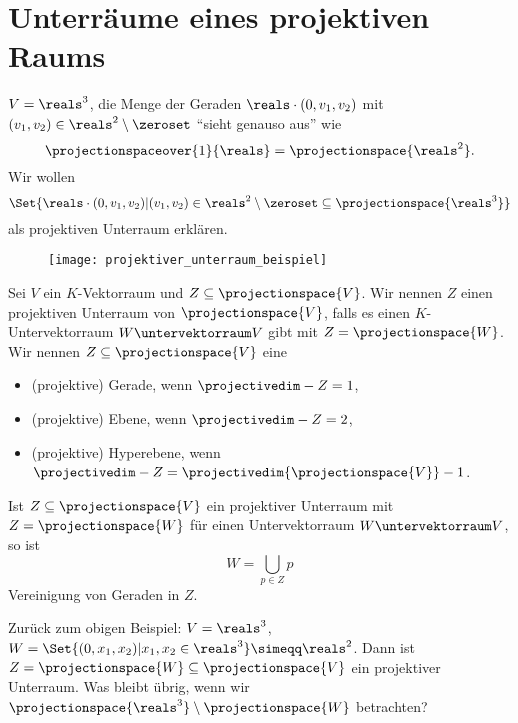 \section*{Unterräume eines projektiven Raums}
\begin{beispiel}
  \( V=\reals^3 \), die Menge der Geraden \( \reals\cdot(0,v_1,v_2) \) mit \( (v_1,v_2)\in \reals^2\setminus\zeroset \) \enquote{sieht genauso aus} wie
  \begin{equation*}
    \projectionspaceover{1}{\reals}=\projectionspace{\reals^2}.
  \end{equation*}
  Wir wollen
  \begin{equation*}
    \Set{\reals\cdot (0,v_1,v_2)|(v_1,v_2)\in \reals^2\setminus\zeroset\subseteq \projectionspace{\reals^3}}
  \end{equation*}
  als projektiven Unterraum erklären.
  \begin{figure}[H]
    \centering
    \texttt{[image: projektiver\_unterraum\_beispiel]}
    \label{fig:projektiver_unterraum_beispiel}
  \end{figure}
\end{beispiel}
\begin{definition*}
  Sei \( V \) ein \( K \)-Vektorraum und \( Z\subseteq \projectionspace{V} \). Wir nennen \( Z \) einen projektiven Unterraum von \( \projectionspace{V} \), falls es einen \( K \)-Untervektorraum \( W\untervektorraum V \) gibt mit \( Z=\projectionspace{W} \). Wir nennen \( Z\subseteq \projectionspace{V} \) eine
  \begin{itemize}
    \item (projektive) Gerade, wenn \( \projectivedim-{Z}=1 \),
    \item (projektive) Ebene, wenn  \( \projectivedim-{Z}=2 \),
    \item (projektive) Hyperebene, wenn \( \projectivedim-{Z}=\projectivedim{\projectionspace{V}}-1 \).
  \end{itemize}
\end{definition*}
\begin{bemerkung*}
  Ist \( Z\subseteq \projectionspace{V} \) ein projektiver Unterraum mit \( Z=\projectionspace{W} \) für einen Untervektorraum \( W\untervektorraum V\), so ist
  \begin{equation*}
    W=\bigcup_{p\in Z} p
  \end{equation*}
  Vereinigung von Geraden in \( Z \).
\end{bemerkung*}
Zurück zum obigen Beispiel: \( V=\reals^3 \), \( W=\Set{(0,x_1,x_2)|x_1,x_2\in\reals^3}\simeqq \reals^2 \). Dann ist \( Z=\projectionspace{W}\subseteq \projectionspace{V} \) ein projektiver Unterraum. Was bleibt übrig, wenn wir \( \projectionspace{\reals^3}\setminus\projectionspace{W} \) betrachten?
